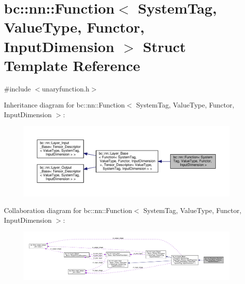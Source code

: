 \hypertarget{structbc_1_1nn_1_1Function}{}\section{bc\+:\+:nn\+:\+:Function$<$ System\+Tag, Value\+Type, Functor, Input\+Dimension $>$ Struct Template Reference}
\label{structbc_1_1nn_1_1Function}


{\ttfamily \#include $<$unaryfunction.\+h$>$}



Inheritance diagram for bc\+:\+:nn\+:\+:Function$<$ System\+Tag, Value\+Type, Functor, Input\+Dimension $>$\+:\nopagebreak
\begin{figure}[H]
\begin{center}
\leavevmode
\includegraphics[width=350pt]{structbc_1_1nn_1_1Function__inherit__graph}
\end{center}
\end{figure}


Collaboration diagram for bc\+:\+:nn\+:\+:Function$<$ System\+Tag, Value\+Type, Functor, Input\+Dimension $>$\+:\nopagebreak
\begin{figure}[H]
\begin{center}
\leavevmode
\includegraphics[width=350pt]{structbc_1_1nn_1_1Function__coll__graph}
\end{center}
\end{figure}
